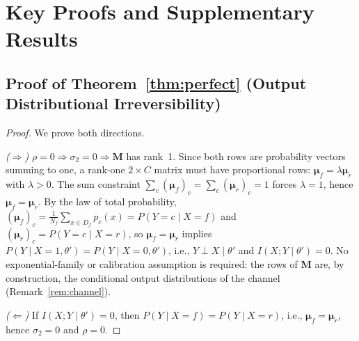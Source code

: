 \documentclass[smallextended]{svjour3}       %
\begin{document}
\section{Key Proofs and Supplementary Results}
\label{sec:appendix}

\subsection{Proof of Theorem~\ref{thm:perfect} (Output Distributional Irreversibility)}
\label{app:perfect}
\begin{proof}
We prove both directions.

\noindent\textit{($\Rightarrow$)} $\rho=0 \Rightarrow \sigma_2=0 \Rightarrow \mathbf{M}$ has rank~1. Since both rows are probability vectors summing to one, a rank-one $2\times C$ matrix must have proportional rows: $\boldsymbol{\mu}_f = \lambda \boldsymbol{\mu}_r$ with $\lambda>0$. The sum constraint $\sum_c (\boldsymbol{\mu}_f)_c = \sum_c (\boldsymbol{\mu}_r)_c = 1$ forces $\lambda=1$, hence $\boldsymbol{\mu}_f = \boldsymbol{\mu}_r$. By the law of total probability, $(\boldsymbol{\mu}_f)_c = \frac{1}{N_f}\sum_{x\in D_f}p_c(x) = P(Y{=}c\mid X{=}f)$ and $(\boldsymbol{\mu}_r)_c = P(Y{=}c\mid X{=}r)$, so $\boldsymbol{\mu}_f=\boldsymbol{\mu}_r$ implies $P(Y\mid X=1,\theta') = P(Y\mid X=0,\theta')$, i.e., $Y\perp X\mid\theta'$ and $I(X;Y\mid\theta')=0$. No exponential-family or calibration assumption is required: the rows of $\mathbf{M}$ are, by construction, the conditional output distributions of the channel (Remark~\ref{rem:channel}).

\noindent\textit{($\Leftarrow$)} If $I(X;Y\mid\theta')=0$, then $P(Y\mid X{=}f)=P(Y\mid X{=}r)$, i.e., $\boldsymbol{\mu}_f = \boldsymbol{\mu}_r$, hence $\sigma_2=0$ and $\rho=0$.
\end{proof}
\end{document}
